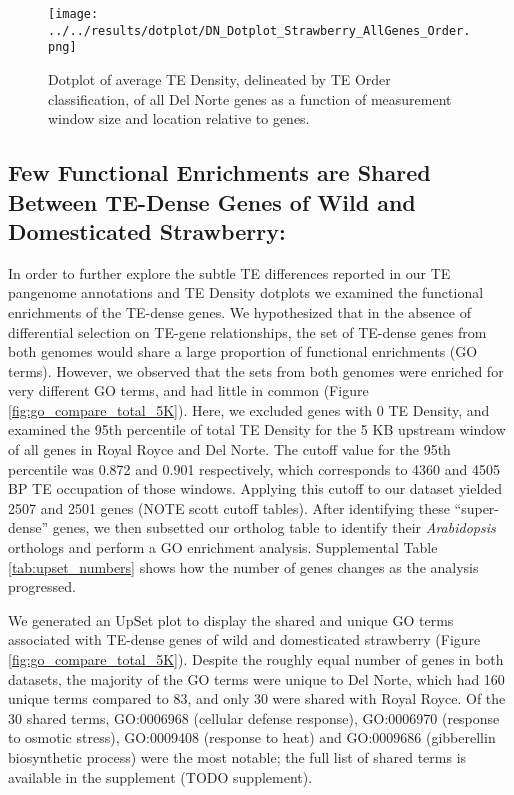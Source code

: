 \documentclass[fleqn,10pt]{olplainarticle}
\begin{document}
\begin{figure}[ht]
\centering
\texttt{[image: ../../results/dotplot/DN\_Dotplot\_Strawberry\_AllGenes\_Order.png]}
\caption{Dotplot of average TE Density, delineated by TE Order classification, of all Del Norte genes as a function of measurement window size and location relative to genes.}
\label{fig:DN_order_dotplot}
\end{figure}

\subsection{Few Functional Enrichments are Shared Between TE-Dense Genes of Wild and Domesticated Strawberry:} \label{sec:shared_unshared_go}
In order to further explore the subtle TE differences reported in our TE pangenome annotations and TE Density dotplots we examined the functional enrichments of the TE-dense genes.
We hypothesized that in the absence of differential selection on TE-gene relationships, the set of TE-dense genes from both genomes would share a large proportion of functional enrichments (GO terms).
However, we observed that the sets from both genomes were enriched for very different GO terms, and had little in common (Figure \ref{fig:go_compare_total_5K}).
Here, we excluded genes with 0 TE Density, and examined the 95th percentile of total TE Density for the 5 KB upstream window of all genes in Royal Royce and Del Norte.
The cutoff value for the 95th percentile was 0.872 and 0.901 respectively, which corresponds to 4360 and 4505 BP TE occupation of those windows.
Applying this cutoff to our dataset yielded 2507 and 2501 genes (NOTE scott cutoff tables).
After identifying these ``super-dense'' genes, we then subsetted our ortholog table to identify their \textit{Arabidopsis} orthologs and perform a GO enrichment analysis.
Supplemental Table \ref{tab:upset_numbers} shows how the number of genes changes as the analysis progressed.

We generated an UpSet plot to display the shared and unique GO terms associated with TE-dense genes of wild and domesticated strawberry (Figure \ref{fig:go_compare_total_5K}).
Despite the roughly equal number of genes in both datasets, the majority of the GO terms were unique to Del Norte, which had 160 unique terms compared to 83, and only 30 were shared with Royal Royce.
Of the 30 shared terms, GO:0006968 (cellular defense response), GO:0006970 (response to osmotic stress), GO:0009408 (response to heat) and GO:0009686 (gibberellin biosynthetic process) were the most notable; the full list of shared terms is available in the supplement (TODO supplement).
\end{document}
